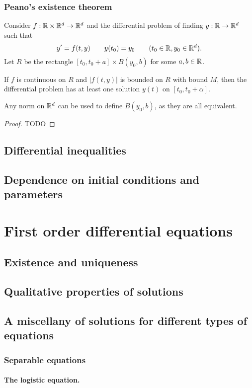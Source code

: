 \subsubsection{Peano's existence theorem}
\begin{theorem}
Consider $f: \mathbb{R}\times \mathbb{R}^d \to \mathbb{R}^d$ and the differential problem of finding $y:\mathbb{R}\to \mathbb{R}^d$ such that
\[ y' = f(t,y) \qquad y(t_0) = y_0 \qquad (t_0\in \mathbb{R}, y_0\in\mathbb{R}^d). \]
Let $R$ be the rectangle $[t_0,t_0+a]\times B(y_0, b)$ for some $a,b\in \mathbb{R}$.

If $f$ is continuous on $R$ and $|f(t,y)|$ is bounded on $R$ with bound $M$, then the differential problem has at least one solution $y(t)$ on $[t_0,t_0+\alpha]$.
\end{theorem}
Any norm on $\mathbb{R}^d$ can be used to define $B(y_0, b)$, as they are all equivalent.
\begin{proof}
TODO
\end{proof}

\subsection{Differential inequalities}
\subsection{Dependence on initial conditions and parameters}

\section{First order differential equations}
\subsection{Existence and uniqueness}
\subsection{Qualitative properties of solutions}
\subsection{A miscellany of solutions for different types of equations}
\subsubsection{Separable equations}
\paragraph{The logistic equation.}
